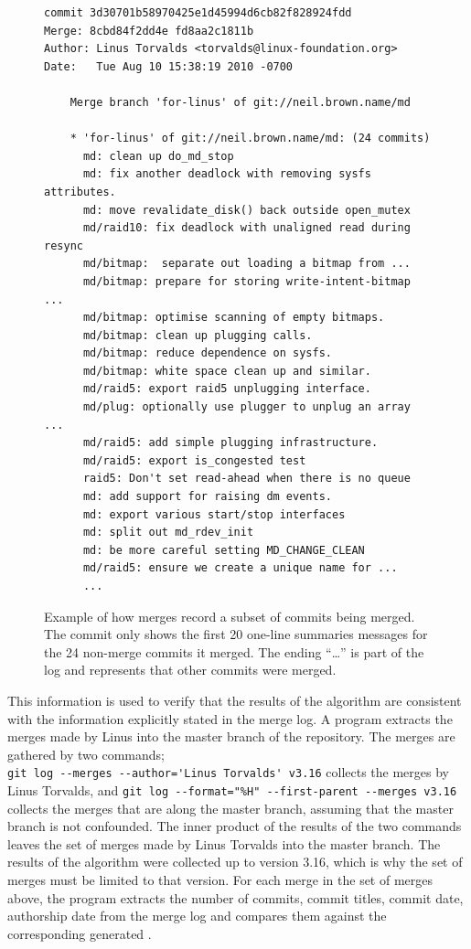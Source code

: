 \begin{figure}[htpb]
  \centering
\begin{textbox}
  \begin{verbatim}commit 3d30701b58970425e1d45994d6cb82f828924fdd
Merge: 8cbd84f2dd4e fd8aa2c1811b
Author: Linus Torvalds <torvalds@linux-foundation.org>
Date:   Tue Aug 10 15:38:19 2010 -0700

    Merge branch 'for-linus' of git://neil.brown.name/md

    * 'for-linus' of git://neil.brown.name/md: (24 commits)
      md: clean up do_md_stop
      md: fix another deadlock with removing sysfs attributes.
      md: move revalidate_disk() back outside open_mutex
      md/raid10: fix deadlock with unaligned read during resync
      md/bitmap:  separate out loading a bitmap from ...
      md/bitmap: prepare for storing write-intent-bitmap ...
      md/bitmap: optimise scanning of empty bitmaps.
      md/bitmap: clean up plugging calls.
      md/bitmap: reduce dependence on sysfs.
      md/bitmap: white space clean up and similar.
      md/raid5: export raid5 unplugging interface.
      md/plug: optionally use plugger to unplug an array ...
      md/raid5: add simple plugging infrastructure.
      md/raid5: export is_congested test
      raid5: Don't set read-ahead when there is no queue
      md: add support for raising dm events.
      md: export various start/stop interfaces
      md: split out md_rdev_init
      md: be more careful setting MD_CHANGE_CLEAN
      md/raid5: ensure we create a unique name for ...
      ...
  \end{verbatim}
\end{textbox}
  \caption{Example of how merges record a subset of commits being merged. The
                commit only shows the first 20 one-line summaries messages for the 24
                non-merge commits it merged. The ending ``\ldots'' is part of the log
                and represents that other commits were merged.}
  \label{fig:sampleMerge}
\end{figure}

This information is used to verify that the results of the \mt{}
algorithm are consistent with the information explicitly stated in the
merge log.
A program extracts the merges made by Linus into the master branch of
the repository.
The merges are gathered by two commands;\\
\verb|git log --merges --author='Linus Torvalds' v3.16| collects the
merges by Linus Torvalds, and
\verb|git log --format="%H" --first-parent --merges v3.16| collects the
merges that are along the master branch, assuming that the master branch
is not confounded.
The inner product of the results of the two commands leaves the set of
merges made by Linus Torvalds into the master branch.
The results of the algorithm were collected up to version 3.16, which is
why the set of merges must be limited to that version.
For each merge in the set of merges above, the program extracts the
number of commits, commit titles, commit date, authorship date from the
merge log and compares them against the corresponding generated \mt{}.

